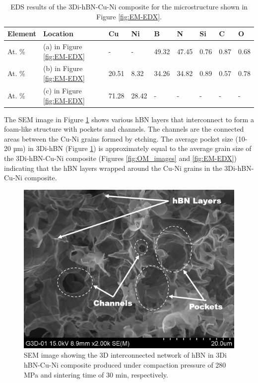 \begin{table}[!htb]
\centering
\caption{EDS results of the 3Di-hBN-Cu-Ni composite for the microstructure shown in Figure \ref{fig:EM-EDX}.}
\resizebox{\linewidth}{!}
{
\begin{tabular}{lllllllll}
\hline
Element & Location        & Cu    & Ni    & B     & N     & Si   & C    & O    \\ \hline
At. \%  & (a) in Figure \ref{fig:EM-EDX} & -     & -     & 49.32 & 47.45 & 0.76 & 0.87 & 0.68 \\
At. \%  & (b) in Figure \ref{fig:EM-EDX} & 20.51 & 8.32  & 34.26 & 34.82 & 0.89 & 0.57 & 0.78 \\
At. \%  & (c) in Figure \ref{fig:EM-EDX} & 71.28 & 28.42 & -     & -     & -    & -    & -    \\ \hline
\end{tabular}
}
\label{tab:edx_analysis}
\end{table}

The SEM image in Figure \ref{fig:SEM-3DihBN} shows various hBN layers that interconnect to form a foam-like structure with pockets and channels. The channels are the connected areas between the Cu-Ni grains formed by etching. The average pocket size (10-20 µm) in 3Di-hBN (Figure \ref{fig:SEM-3DihBN}) is approximately equal to the average grain size of the 3Di-hBN-Cu-Ni composite (Figures \ref{fig:OM_images} and \ref{fig:EM-EDX}) indicating that the hBN layers wrapped around the Cu-Ni grains in the 3Di-hBN-Cu-Ni composite.

\begin{figure}[!htb]
\centering
\includegraphics [scale=1.0]{graphics/chapter_2/SEM-3DihBN}
\caption{SEM image showing the 3D interconnected network of hBN in 3Di hBN-Cu-Ni composite produced under compaction pressure of 280 MPa and sintering time of 30 min, respectively.}
\label{fig:SEM-3DihBN}
\end{figure}

